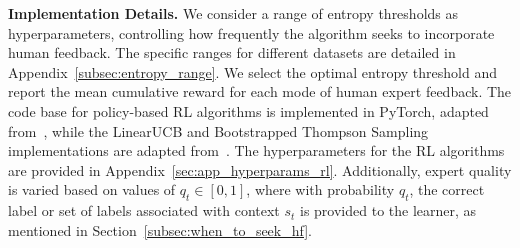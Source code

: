 \textbf{Implementation Details.}  
We consider a range of entropy thresholds as hyperparameters, controlling how frequently the algorithm seeks to incorporate human feedback. The specific ranges for different datasets are detailed in Appendix~\ref{subsec:entropy_range}. We select the optimal entropy threshold and report the mean cumulative reward for each mode of human expert feedback. The code base for policy-based RL algorithms is implemented in PyTorch, adapted from~\citep{minimalRL}, while the LinearUCB and Bootstrapped Thompson Sampling implementations are adapted from~\citep{cortes2019adapting}. The hyperparameters for the RL algorithms are provided in Appendix~\ref{sec:app_hyperparams_rl}. Additionally, expert quality is varied based on values of $q_t \in [0, 1]$, where with probability $q_t$, the correct label or set of labels associated with context $s_t$ is provided to the learner, as mentioned in Section~\ref{subsec:when_to_seek_hf}.








